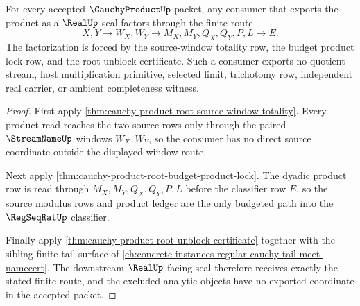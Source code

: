 \begin{theorem}
\label{thm:cauchy-product-source-window-seal-consumer-exactness}
For every accepted $\CauchyProductUp$ packet, any consumer that exports the product as a $\RealUp$ seal factors through the finite route
$$
X,Y \to W_X,W_Y \to M_X,M_Y,Q_X,Q_Y,P,L \to E .
$$
The factorization is forced by the source-window totality row, the budget product lock row, and the root-unblock certificate. Such a consumer exports no quotient stream, host multiplication primitive, selected limit, trichotomy row, independent real carrier, or ambient completeness witness.
\end{theorem}
\begin{proof}
First apply \autoref{thm:cauchy-product-root-source-window-totality}. Every product read reaches the two source rows only through the paired $\StreamNameUp$ windows $W_X,W_Y$, so the consumer has no direct source coordinate outside the displayed window route.

Next apply \autoref{thm:cauchy-product-root-budget-product-lock}. The dyadic product row is read through $M_X,M_Y,Q_X,Q_Y,P,L$ before the classifier row $E$, so the source modulus rows and product ledger are the only budgeted path into the $\RegSeqRatUp$ classifier.

Finally apply \autoref{thm:cauchy-product-root-unblock-certificate} together with the sibling finite-tail surface of \autoref{ch:concrete-instances-regular-cauchy-tail-meet-namecert}. The downstream $\RealUp$-facing seal therefore receives exactly the stated finite route, and the excluded analytic objects have no exported coordinate in the accepted packet.
\end{proof}

